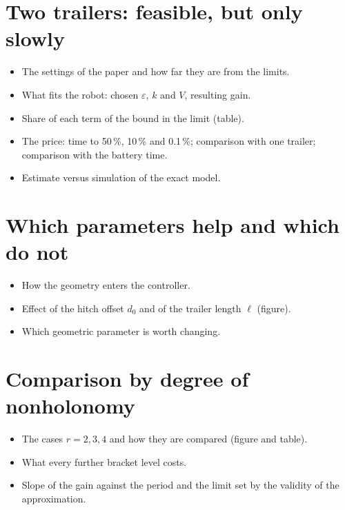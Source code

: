 \section{Two trailers: feasible, but only slowly}
\label{sec:feas-two}

\begin{itemize}
  \item The settings of the paper and how far they are from the limits.
  \item What fits the robot: chosen $\varepsilon$, $k$ and $V$, resulting gain.
  \item Share of each term of the bound in the limit (table).
  \item The price: time to 50\,\%, 10\,\% and 0.1\,\%; comparison with one trailer; comparison with the battery time.
  \item Estimate versus simulation of the exact model.
\end{itemize}

\section{Which parameters help and which do not}
\label{sec:feas-geometry}

\begin{itemize}
  \item How the geometry enters the controller.
  \item Effect of the hitch offset $d_0$ and of the trailer length $\ell$ (figure).
  \item Which geometric parameter is worth changing.
\end{itemize}

\section{Comparison by degree of nonholonomy}
\label{sec:feas-r}

\begin{itemize}
  \item The cases $r=2,3,4$ and how they are compared (figure and table).
  \item What every further bracket level costs.
  \item Slope of the gain against the period and the limit set by the validity of the approximation.
\end{itemize}

